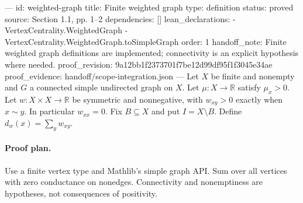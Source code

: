 ---
id: weighted-graph
title: Finite weighted graph
type: definition
status: proved
source: Section 1.1, pp. 1–2
dependencies: []
lean_declarations:
- VertexCentrality.WeightedGraph
- VertexCentrality.WeightedGraph.toSimpleGraph
order: 1
handoff_note: Finite weighted graph definitions are implemented; connectivity is an explicit hypothesis where needed.
proof_revision: 9a12bb1f2373701f7be12d99df95f1f3045e34ae
proof_evidence: handoff/scope-integration.json
---
Let $X$ be finite and nonempty and $G$ a connected simple undirected graph on $X$. Let $\mu:X\to\mathbb R$ satisfy $\mu_x>0$. Let $w:X\times X\to\mathbb R$ be symmetric and nonnegative, with $w_{xy}>0$ exactly when $x\sim y$. In particular $w_{xx}=0$. Fix $B\subseteq X$ and put $I=X\setminus B$. Define $d_w(x)=\sum_y w_{xy}$.

\paragraph{Proof plan.}
Use a finite vertex type and Mathlib's simple graph API. Sum over all vertices with zero conductance on nonedges. Connectivity and nonemptiness are hypotheses, not consequences of positivity.
